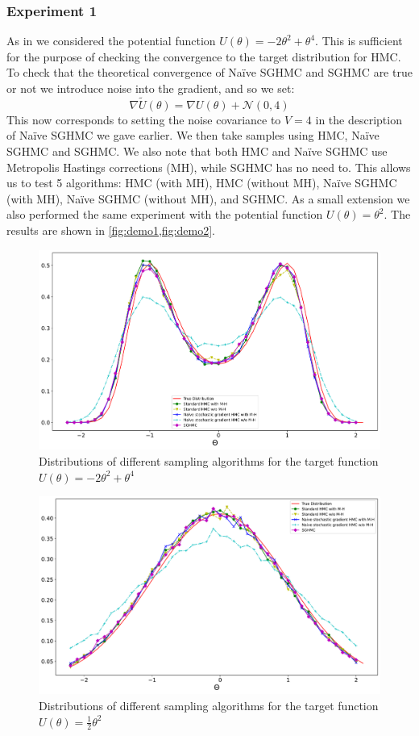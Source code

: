 \subsubsection*{Experiment 1}
As in \cite{sghmc} we considered the potential function $U(\theta) = -2\theta^2 + \theta^4$. This is sufficient for the purpose of checking the convergence to the target distribution for HMC. To check that the theoretical convergence of Naïve SGHMC and SGHMC are true or not we introduce noise into the gradient, and so we set:
$$\nabla \widetilde{U}(\theta) = \nabla U(\theta) + \mathcal{N}(0,4)$$
This now corresponds to setting the noise covariance to $V=4$ in the description of Naïve SGHMC we gave earlier. We then take samples using HMC, Naïve SGHMC and SGHMC. We also note that both HMC and Naïve SGHMC use Metropolis Hastings corrections (MH), while SGHMC has no need to. This allows us to test 5 algorithms: HMC (with MH), HMC (without MH), Naïve SGHMC (with MH), Naïve SGHMC (without MH), and SGHMC. As a small extension we also performed the same experiment with the potential function $U(\theta) = \theta^2$. The results are shown in \cref{fig:demo1,fig:demo2}.
\begin{figure}[h!]
  \includegraphics[width=.9\linewidth]{parts/Images/fig1a.pdf}
  \caption{Distributions of different sampling algorithms for the target function $U(\theta) = -2\theta^2 + \theta^4$}
  \label{fig1a}
  \label{fig:demo1}
\end{figure}
\begin{figure}[h!]
  \includegraphics[width=.9\linewidth]{parts/Images/fig1b.pdf}
  \caption{Distributions of different sampling algorithms for the target function $U(\theta) = \frac{1}{2}\theta^2$}
  \label{fig:demo2}
\end{figure}
